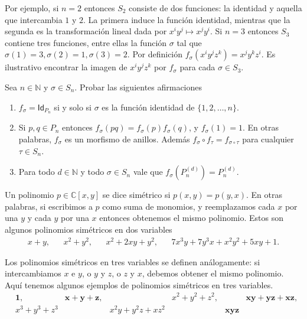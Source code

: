 \documentclass[11pt,fleqn]{article}
\newcommand\NN{\mathbb N}
\newcommand\CC{\mathbb C}
\newcommand\id{\mathsf{Id}}
\begin{document}
Por ejemplo, si $n = 2$ entonces $S_2$ consiste de dos funciones: la identidad
y aquella que intercambia $1$ y $2$. La primera induce la función identidad, 
mientras que la segunda es la transformación lineal dada por $x^i y^j \mapsto 
x^j y^i$. Si $n = 3$ entonces $S_3$ contiene tres funciones, entre ellas la 
función $\sigma$ tal que $\sigma(1) = 3, \sigma(2) = 1, \sigma(3) = 2$. Por 
definición $f_{\sigma}(x^i y^j z^k) = x^j y^k z^i$. Es ilustrativo encontrar
la imagen de $x^i y^j z^k$ por $f_\sigma$ para cada $\sigma \in S_3$.

\begin{Ejercicio}
Sea $n \in \NN$ y $\sigma \in S_n$. Probar las siguientes afirmaciones
\begin{enumerate}
\item $f_{\sigma} = \id_{P_n}$ si y solo si $\sigma$ es la función
identidad de $\{1, 2, \ldots, n\}$.

\item Si $p,q \in P_n$ entonces $f_\sigma(pq) = f_\sigma(p) f_\sigma(q)$,
y $f_\sigma(1) = 1$. En otras palabras, $f_\sigma$ es un morfismo de anillos.
Además $f_\sigma \circ f_\tau = f_{\sigma \circ \tau}$ para cualquier $\tau 
\in S_n$. 

\item Para todo $d \in \NN$ y todo $\sigma \in S_n$ vale que
$f_\sigma(P_n^{(d)}) = P_n^{(d)}$.
\end{enumerate}
\end{Ejercicio}


Un polinomio $p \in \CC[x,y]$ se dice simétrico si $p(x,y) = p(y,x)$. En otras
palabras, si escribimos a $p$ como suma de monomios, y reemplazamos cada $x$ 
por una $y$ y cada $y$ por una $x$ entonces obtenemos el mismo polinomio.
Estos son algunos polinomios simétricos en dos variables
\begin{align*}
x+y, 
	&& x^2 + y^2, 
	&& x^2 + 2xy + y^2, 
	&& 7x^3y + 7y^3x + x^2y^2 + 5xy + 1.
\end{align*}

Los polinomios simétricos en tres variables se definen análogamente: si 
intercambiamos $x$ e $y$, o $y$ y $z$, o $z$ y $x$, debemos obtener el mismo 
polinomio. Aquí tenemos algunos ejemplos de polinomios simétricos en tres 
variables.
\begin{align*}
&\mathbf{1},
	&\mathbf{x + y +z},
	&& x^2 + y^2 + z^2,
	&&\mathbf{xy + yz + xz}, \\
& x^3 + y^3 + z^3 
	&& x^2y + y^2z + xz^2
	&& \mathbf{xyz}
\end{align*}
\end{document}
